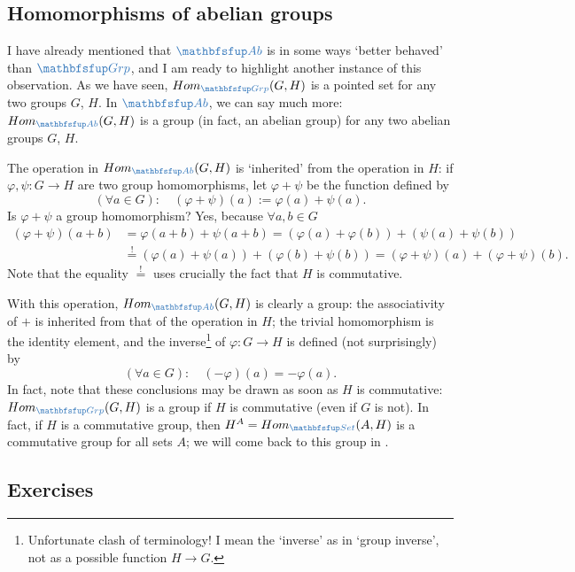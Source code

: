\subsection{Homomorphisms of abelian groups}
\label{subsec:groups:homomorphisms-of-abelian-groups}
I have already mentioned that $\categ{Ab}$ is in some ways `better
behaved' than $\categ{Grp}$, and I am ready to highlight another
instance of this observation. As we have seen,
$\Hom_{\categ{Grp}}(G,H)$ is a pointed set for any two groups $G$,
$H$. In $\categ{Ab}$, we can say much more: $\Hom_{\categ{Ab}}(G,H)$
is a group (in fact, an abelian group) for any two abelian groups $G$,
$H$.

The operation in $\Hom_{\categ{Ab}}(G,H)$ is `inherited' from the
operation in $H$: if $\varphi, \psi : G \to H$ are two group
homomorphisms, let $\varphi + \psi$ be the function defined by
\[ (\forall a \in G) \colon \quad (\varphi + \psi)(a) := \varphi(a) +
  \psi(a). \] Is $\varphi + \psi$ a group homomorphism? Yes, because
$\forall a, b \in G$
\begin{align*}
  (\varphi + \psi)(a + b) &= \varphi(a + b) + \psi(a + b)
                            = (\varphi(a) + \varphi(b)) + (\psi(a) + \psi(b)) \\
                          &\overset{!}{=} (\varphi(a) + \psi(a)) + (\varphi(b) + \psi(b))
                            = (\varphi + \psi)(a) + (\varphi + \psi)(b).
\end{align*}
Note that the equality $\overset{!}{=}$ uses crucially the fact that
$H$ is commutative.

With this operation, $\Hom_{\categ{Ab}}(G,H)$ is clearly a group: the
associativity of $+$ is inherited from that of the operation in $H$;
the trivial homomorphism is the identity element, and the
inverse\footnote{Unfortunate clash of terminology! I mean the
  `inverse' as in `group inverse', not as a possible function
  $H \to G$.} of $\varphi : G \to H$ is defined (not surprisingly) by
\[ (\forall a \in G) \colon \quad (-\varphi)(a) = -\varphi(a). \] In
fact, note that these conclusions may be drawn as soon as $H$ is
commutative: $\Hom_{\categ{Grp}}(G,H)$ is a group if $H$ is
commutative (even if $G$ is not). In fact, if $H$ is a commutative
group, then $H^A = \Hom_{\categ{Set}}(A,H)$ is a commutative group for
all sets $A$; we will come back to this group in
.

\subsection*{Exercises}

